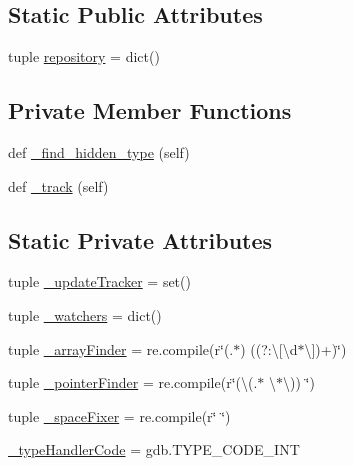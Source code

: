 \subsection*{Static Public Attributes}
\begin{DoxyCompactItemize}
\item 
tuple \hyperlink{classmemoryoracle_1_1instance_1_1Int_a47c30a67515de0d4f90403c5c16fa6ed}{repository} = dict()
\end{DoxyCompactItemize}
\subsection*{Private Member Functions}
\begin{DoxyCompactItemize}
\item 
def \hyperlink{classmemoryoracle_1_1instance_1_1Int_a450a73bc8aaf1a7ac5f18c3ed1a933fc}{\+\_\+find\+\_\+hidden\+\_\+type} (self)
\item 
def \hyperlink{classmemoryoracle_1_1instance_1_1Int_a38c9424341353f006771163d360594da}{\+\_\+track} (self)
\end{DoxyCompactItemize}
\subsection*{Static Private Attributes}
\begin{DoxyCompactItemize}
\item 
tuple \hyperlink{classmemoryoracle_1_1instance_1_1Int_ac2ea4b02c479861b9b5c6d371681a7c0}{\+\_\+update\+Tracker} = set()
\item 
tuple \hyperlink{classmemoryoracle_1_1instance_1_1Int_a36bd92d1d7bdd201909ee915c8aee98d}{\+\_\+watchers} = dict()
\item 
tuple \hyperlink{classmemoryoracle_1_1instance_1_1Int_a43fc91196a9f69183688d7f5a0bd6a17}{\+\_\+array\+Finder} = re.\+compile(r\char`\"{}(.$\ast$) ((?\+:\textbackslash{}\mbox{[}\textbackslash{}d$\ast$\textbackslash{}\mbox{]})+)\char`\"{})
\item 
tuple \hyperlink{classmemoryoracle_1_1instance_1_1Int_a74d2d1d291b5d9f06c7230b60ebf1aab}{\+\_\+pointer\+Finder} = re.\+compile(r\char`\"{}(\textbackslash{}(.$\ast$ \textbackslash{}$\ast$\textbackslash{})) \char`\"{})
\item 
tuple \hyperlink{classmemoryoracle_1_1instance_1_1Int_af6f914a5e9c579d053807ef66fd53b80}{\+\_\+space\+Fixer} = re.\+compile(r\char`\"{} \char`\"{})
\item 
\hyperlink{classmemoryoracle_1_1instance_1_1Int_a2e5b022c97d7178ec6ea724a3ac7b828}{\+\_\+type\+Handler\+Code} = gdb.\+T\+Y\+P\+E\+\_\+\+C\+O\+D\+E\+\_\+\+I\+N\+T
\end{DoxyCompactItemize}
